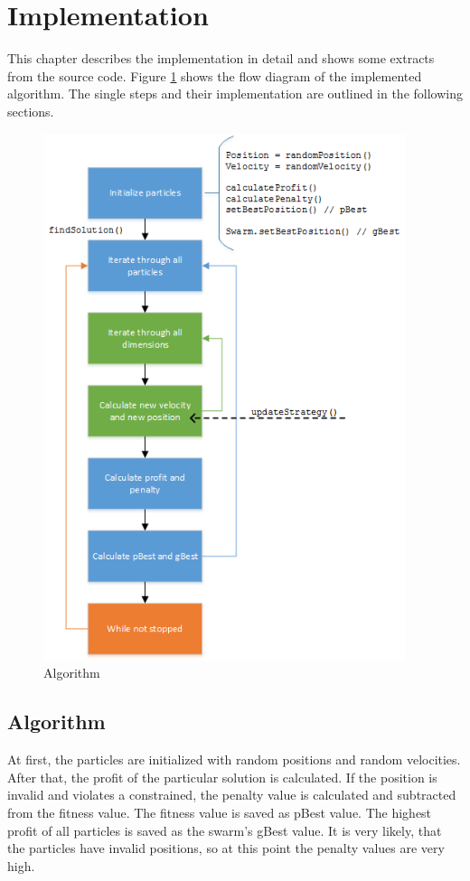 \documentclass{article}
\begin{document}
\section{Implementation}
\label{lbl-impl}
This chapter describes the implementation in detail and shows some extracts from the source code. Figure \ref{fig-algo} shows the flow diagram of the implemented algorithm. The single steps and their implementation are outlined in the following sections.

\begin{figure}[H]
    \centering
    \includegraphics[width=400px]{images/algo.png}
    \caption{Algorithm}
    \label{fig-algo}
\end{figure}

\newpage

\subsection{Algorithm}
At first, the particles are initialized with random positions and random velocities. After that, the profit of the particular solution is calculated. If the position is invalid and violates a constrained, the penalty value is calculated and subtracted from the fitness value. The fitness value is saved as pBest value. The highest profit of all particles is saved as the swarm's gBest value. It is very likely, that the particles have invalid positions, so at this point the penalty values are very high.\\
\end{document}
